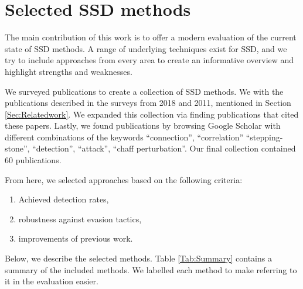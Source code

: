 \documentclass[runningheads]{llncs}\usepackage[]{graphicx}\usepackage[]{color}
\begin{document}
 





\section{Selected SSD methods}\label{Sec:Selection}

The main contribution of this work is to offer a modern evaluation of the current state of SSD methods. A range of underlying techniques exist for SSD, and we try to include approaches from every area to create an informative overview and highlight strengths and weaknesses. 

We surveyed publications to create a collection of SSD methods. We with the publications described in the surveys \cite{shullich2011survey,wang2018research} from 2018 and 2011, mentioned in Section \ref{Sec:Relatedwork}. We expanded this collection via finding publications that cited these papers. Lastly, we found publications by browsing Google Scholar with different combinations of the keywords ``connection'', ``correlation'' ``stepping-stone'', ``detection'', ``attack'', ``chaff perturbation''. Our final collection contained 60 publications. 

From here, we selected approaches based on the following criteria:

\begin{enumerate}
\item Achieved detection rates,
\item robustness against evasion tactics,
\item improvements of previous work.
\end{enumerate}

Below, we describe the selected methods. Table \ref{Tab:Summary} contains a summary of the included methods. We labelled each method to make referring to it in the evaluation easier.
\end{document}
